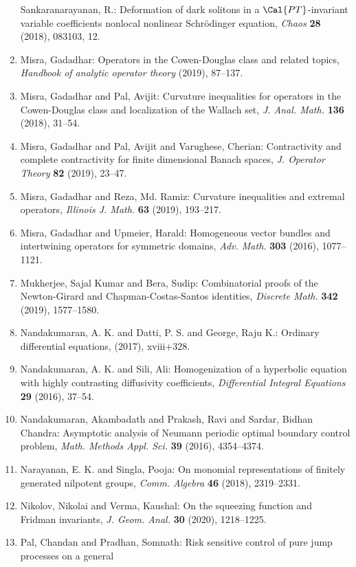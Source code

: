 \begin{enumerate}
Sankaranarayanan, R.: Deformation of dark solitons in a {$\Cal{PT}$}-invariant
variable coefficients nonlocal nonlinear {S}chr\"{o}dinger
equation, \emph{Chaos} {\bf 28} (2018), 083103, 12.
\item Misra, Gadadhar: Operators in the {C}owen-{D}ouglas class and related topics, \emph{Handbook of analytic operator theory} {\bf } (2019), 87--137.
\item Misra, Gadadhar and Pal, Avijit: Curvature inequalities for operators in the {C}owen-{D}ouglas
class and localization of the {W}allach set, \emph{J. Anal. Math.} {\bf 136} (2018), 31--54.
\item Misra, Gadadhar and Pal, Avijit and Varughese, Cherian: Contractivity and complete contractivity for finite
dimensional {B}anach spaces, \emph{J. Operator Theory} {\bf 82} (2019), 23--47.
\item Misra, Gadadhar and Reza, Md. Ramiz: Curvature inequalities and extremal operators, \emph{Illinois J. Math.} {\bf 63} (2019), 193--217.
\item Misra, Gadadhar and Upmeier, Harald: Homogeneous vector bundles and intertwining operators for
symmetric domains, \emph{Adv. Math.} {\bf 303} (2016), 1077--1121.
\item Mukherjee, Sajal Kumar and Bera, Sudip: Combinatorial proofs of the {N}ewton-{G}irard and
{C}hapman-{C}ostas-{S}antos identities, \emph{Discrete Math.} {\bf 342} (2019), 1577--1580.
\item Nandakumaran, A. K. and Datti, P. S. and George, Raju K.: Ordinary differential equations, \emph{} {\bf } (2017), xviii+328.
\item Nandakumaran, A. K. and Sili, Ali: Homogenization of a hyperbolic equation with highly
contrasting diffusivity coefficients, \emph{Differential Integral Equations} {\bf 29} (2016), 37--54.
\item Nandakumaran, Akambadath and Prakash, Ravi and Sardar, Bidhan
Chandra: Asymptotic analysis of {N}eumann periodic optimal boundary
control problem, \emph{Math. Methods Appl. Sci.} {\bf 39} (2016), 4354--4374.
\item Narayanan, E. K. and Singla, Pooja: On monomial representations of finitely generated nilpotent
groups, \emph{Comm. Algebra} {\bf 46} (2018), 2319--2331.
\item Nikolov, Nikolai and Verma, Kaushal: On the squeezing function and {F}ridman invariants, \emph{J. Geom. Anal.} {\bf 30} (2020), 1218--1225.
\item Pal, Chandan and Pradhan, Somnath: Risk sensitive control of pure jump processes on a general

\end{enumerate}

